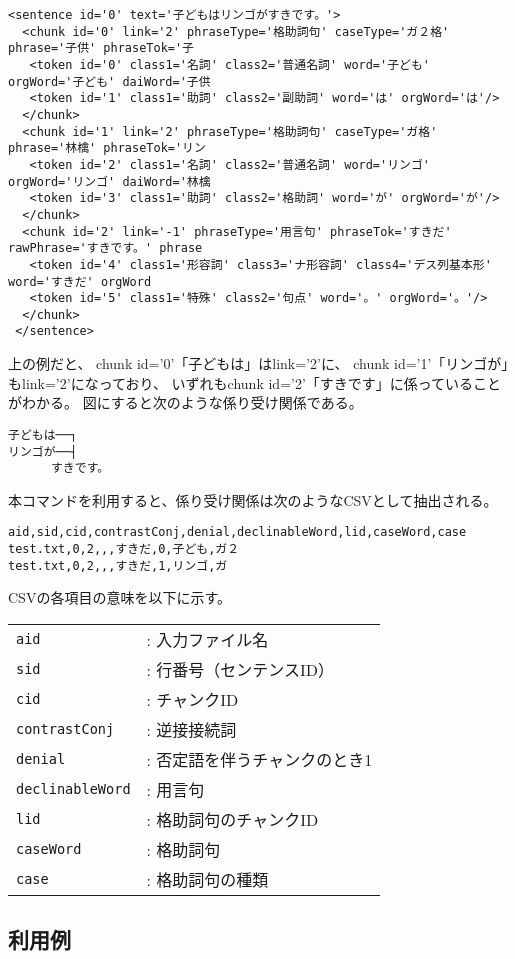 \begin{Verbatim}[baselinestretch=0.7,frame=single]
 <sentence id='0' text='子どもはリンゴがすきです。'>
  <chunk id='0' link='2' phraseType='格助詞句' caseType='ガ２格' phrase='子供' phraseTok='子
   <token id='0' class1='名詞' class2='普通名詞' word='子ども' orgWord='子ども' daiWord='子供
   <token id='1' class1='助詞' class2='副助詞' word='は' orgWord='は'/>
  </chunk>
  <chunk id='1' link='2' phraseType='格助詞句' caseType='ガ格' phrase='林檎' phraseTok='リン
   <token id='2' class1='名詞' class2='普通名詞' word='リンゴ' orgWord='リンゴ' daiWord='林檎
   <token id='3' class1='助詞' class2='格助詞' word='が' orgWord='が'/>
  </chunk>
  <chunk id='2' link='-1' phraseType='用言句' phraseTok='すきだ' rawPhrase='すきです。' phrase
   <token id='4' class1='形容詞' class3='ナ形容詞' class4='デス列基本形' word='すきだ' orgWord
   <token id='5' class1='特殊' class2='句点' word='。' orgWord='。'/>
  </chunk>
 </sentence>
\end{Verbatim}

上の例だと、
chunk id='0'「子どもは」はlink='2'に、
chunk id='1'「リンゴが」もlink='2'になっており、
いずれもchunk id='2'「すきです」に係っていることがわかる。
図にすると次のような係り受け関係である。

\begin{Verbatim}[baselinestretch=0.7,frame=single]
子どもは──┐　
リンゴが──┤　
      すきです。
\end{Verbatim}

本コマンドを利用すると、係り受け関係は次のようなCSVとして抽出される。

\begin{Verbatim}[baselinestretch=0.7,frame=single]
aid,sid,cid,contrastConj,denial,declinableWord,lid,caseWord,case
test.txt,0,2,,,すきだ,0,子ども,ガ２
test.txt,0,2,,,すきだ,1,リンゴ,ガ
\end{Verbatim}

CSVの各項目の意味を以下に示す。

\begin{table}[htbp]
{\small
\begin{tabular}{ll}
\verb|aid|            & : 入力ファイル名 \\  
\verb|sid|            & : 行番号（センテンスID） \\  
\verb|cid|            & : チャンクID \\  
\verb|contrastConj|   & : 逆接接続詞 \\  
\verb|denial|         & : 否定語を伴うチャンクのとき1 \\  
\verb|declinableWord| & : 用言句 \\  
\verb|lid|            & : 格助詞句のチャンクID \\  
\verb|caseWord|       & : 格助詞句 \\  
\verb|case|           & : 格助詞句の種類 \\  
\end{tabular} 
}
\end{table} 

\vspace{3cm}





\subsection{利用例}


%

